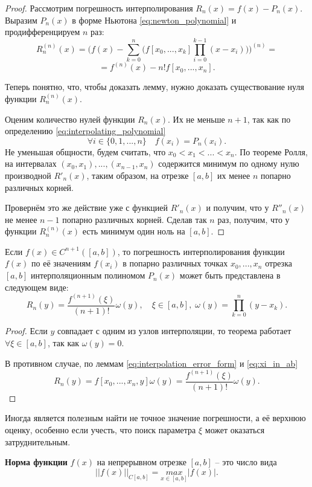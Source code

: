 \documentclass[../main.tex]{subfile}
\begin{document}
\begin{proof}
	Рассмотрим погрешность интерполирования $R_n(x)=f(x)-P_n(x)$. Выразим
	$P_n(x)$ в форме Ньютона \eqref{eq:newton_polynomial} и
	продифференцируем $n$ раз:
	\[R_n^{(n)}(x) = \Big(f(x) - \sum_{k=0}^{n}\big(f[x_0,...,x_k]\prod_
	{i=0}^{k-1}(x-x_i)\big)\Big)^{(n)}=\]
	\[=f^{(n)}(x) - n!f[x_0,...,x_n].\]

	Теперь понятно, что, чтобы доказать лемму, нужно доказать
	существование нуля функции $R_n^{(n)}(x)$.

	Оценим количество нулей функции $R_n(x)$. Их не меньше $n+1$, так как
	по определению \eqref{eq:interpolating_polynomial}
	\[\forall i\in \{0,1,...,n\}\quad f(x_i)=P_n(x_i).\]
	Не уменьшая общности, будем считать, что $x_0<x_1<...<x_n$.
	По теореме Ролля, на интервалах $(x_0,x_1),...,(x_{n-1},x_n)$ содержится
	минимум по одному нулю производной $R'_n(x)$, таким образом, на отрезке
	$[a,b]$ их менее $n$ попарно различных корней.

	Провернём это же действие уже с функцией $R'_n(x)$ и получим, что у
	$R''_n(x)$ не менее $n-1$ попарно различных корней. Сделав так $n$ раз,
	получим, что у функции $R_n^{(n)}(x)$ есть минимум один ноль на $[a,b]$.
\end{proof}

\begin{theorem}\label{eq:interpolation_der_error_form}
	Если $f(x)\in C^{n+1}([a,b])$, то погрешность интерполирования функции
	$f(x)$ по её значениям $f(x_i)$ в попарно различных точках $x_0,...,x_n$
	отрезка $[a,b]$ интерполяционным полиномом $P_n(x)$ может быть
	представлена в следующем виде:
	\[\boxed{R_n(y)=\frac{f^{(n+1)}(\xi)}{(n+1)!}\omega(y)},\quad\xi\in
	[a,b],\;\omega(y)=\prod_{k=0}^{n}(y-x_k).\]
\end{theorem}

\begin{proof}
	Если $y$ совпадает с одним из узлов интерполяции, то теорема работает
	$\forall\xi\in[a,b]$, так как $\omega(y)=0$.

	В противном случае, по леммам \eqref{eq:interpolation_error_form} и
	\eqref{eq:xi_in_ab}
	\[R_n(y)=f[x_0,...,x_n,y]\omega(y)=\frac{f^{(n+1)}(\xi)}{(n+1)!}
	\omega(y).\]
\end{proof}

Иногда является полезным найти не точное значение погрешности, а её верхнюю
оценку, особенно если учесть, что поиск параметра $\xi$ может оказаться
затруднительным.

\begin{define}\label{eq:function_norm}
	\textbf{Норма функции} $f(x)$ на непрерывном отрезке $[a,b]$ -- это
	число вида
	\[||f(x)||_{C[a,b]}=\underset{x\in[a,b]}{max}|f(x)|.\]
\end{define}
\end{document}
